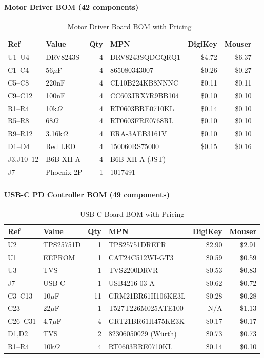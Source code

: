 \paragraph{Motor Driver BOM (42 components)}
\begin{table}[H]
\centering
\caption{Motor Driver Board BOM with Pricing}
\label{tab:bom-motor-full}
\footnotesize
\begin{tabular}{@{}llrlrr@{}}
\toprule
\textbf{Ref} & \textbf{Value} & \textbf{Qty} & \textbf{MPN} & \textbf{DigiKey} & \textbf{Mouser} \\
\midrule
U1--U4 & DRV8243S & 4 & DRV8243SQDGQRQ1 & \$4.72 & \$6.37 \\
C1--C4 & 56$\mu$F & 4 & 865080343007 & \$0.26 & \$0.27 \\
C5--C8 & 220nF & 4 & CL10B224KB8NNNC & \$0.11 & \$0.11 \\
C9--C12 & 100nF & 4 & CC603JRX7R9BB104 & \$0.10 & \$0.10 \\
R1--R4 & 10k$\Omega$ & 4 & RT0603BRE0710KL & \$0.14 & \$0.10 \\
R5--R8 & 68$\Omega$ & 4 & RT0603FRE0768RL & \$0.10 & \$0.10 \\
R9--R12 & 3.16k$\Omega$ & 4 & ERA-3AEB3161V & \$0.10 & \$0.10 \\
D1--D4 & Red LED & 4 & 150060RS75000 & \$0.15 & \$0.16 \\
J3,J10--12 & B6B-XH-A & 4 & B6B-XH-A (JST) & -- & -- \\
J7 & Phoenix 2P & 1 & 1017491 & -- & -- \\
\bottomrule
\end{tabular}
\end{table}

\paragraph{USB-C PD Controller BOM (49 components)}
\begin{table}[H]
\centering
\caption{USB-C Board BOM with Pricing}
\label{tab:bom-usbc-full}
\footnotesize
\begin{tabular}{@{}llrlrr@{}}
\toprule
\textbf{Ref} & \textbf{Value} & \textbf{Qty} & \textbf{MPN} & \textbf{DigiKey} & \textbf{Mouser} \\
\midrule
U2 & TPS25751D & 1 & TPS25751DREFR & \$2.90 & \$2.91 \\
U1 & EEPROM & 1 & CAT24C512WI-GT3 & \$0.59 & \$0.59 \\
U3 & TVS & 1 & TVS2200DRVR & \$0.53 & \$0.83 \\
J7 & USB-C & 1 & USB4216-03-A & \$0.62 & \$0.72 \\
C3--C13 & 10$\mu$F & 11 & GRM21BR61H106KE3L & \$0.28 & \$0.28 \\
C23 & 22$\mu$F & 1 & T527T226M025ATE100 & N/A & \$1.13 \\
C26--C31 & 4.7$\mu$F & 4 & GRT21BR61H475KE3K & \$0.17 & \$0.17 \\
D1,D2 & TVS & 2 & 82306050029 (Würth) & \$0.73 & \$0.73 \\
R1--R4 & 10k$\Omega$ & 4 & RT0603BRE0710KL & \$0.14 & \$0.10 \\
\bottomrule
\end{tabular}
\end{table}

